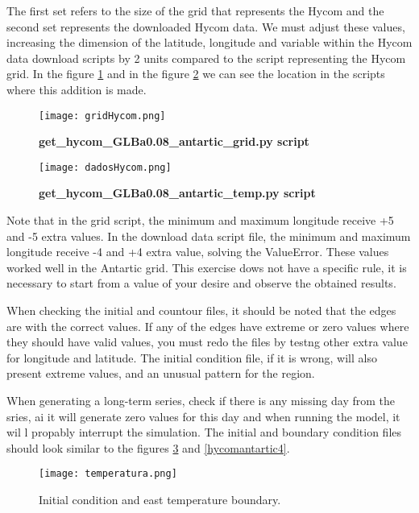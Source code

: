 \noindent The first set refers to the size of the grid that represents the Hycom and the second set represents the downloaded Hycom data. We must adjust these values, 
increasing the dimension of the latitude, longitude and variable within the Hycom data download scripts by 2 units compared to the script representing the Hycom grid. 
In the figure \textcolor{bleu_cite}{\ref{hycomantartic1}} and in the figure \textcolor{bleu_cite}{\ref{hycomantartic2}} we can see the location in the scripts where this addition is made.
\bigskip

\begin{figure}[H]
    \centering
    \texttt{[image: gridHycom.png]}
    \caption{\textbf{get\_hycom\_GLBa0.08\_antartic\_grid.py script}}
    \label{hycomantartic1}
\end{figure}
\bigskip


\begin{figure}[H]
    \centering
    \texttt{[image: dadosHycom.png]}
    \caption{\textbf{get\_hycom\_GLBa0.08\_antartic\_temp.py script}}
    \label{hycomantartic2}
\end{figure}
\bigskip

\noindent Note that in the grid script, the minimum and maximum longitude receive +5 and -5 extra values. In the download data script file, the minimum and maximum
longitude receive -4 and +4 extra value, solving the ValueError. These values worked well in the Antartic grid. This exercise dows not have a specific rule, it is 
necessary to start from a value of your desire and observe the obtained results.
\bigskip

\noindent When checking the initial and countour files, it should be noted that the edges are with the correct values. If any of the edges have extreme or zero values
where they should have valid values, you must redo the files by testng other extra value for longitude and latitude. The initial condition file, if it is wrong, will also 
present extreme values, and an unusual pattern for the region. 
\bigskip

\noindent When generating a long-term series, check if there is any missing day from the sries, ai it will generate zero values for this day and when running the model,
it wil l propably interrupt the simulation.  The initial and boundary condition files should look similar to the figures \textcolor{bleu_cite}{\ref{hycomantartic3}} and \textcolor{bleu_cite}{\ref{hycomantartic4}}.
\bigskip


\begin{figure} [!htb] 
    \centering
    \texttt{[image: temperatura.png]}
    \caption{Initial condition and east temperature boundary.}
    \label{hycomantartic3}
    \end{figure}
    

